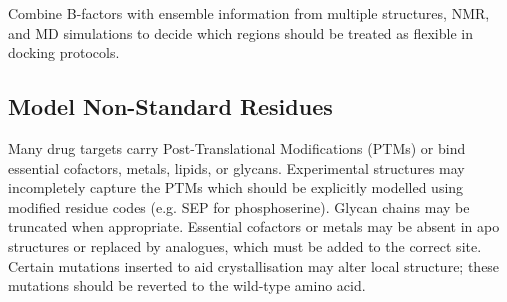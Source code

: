 \documentclass[12pt]{article}
\begin{document}
Combine B-factors with ensemble information from multiple structures, NMR, and MD simulations to decide which regions should be treated as flexible in docking protocols.

\subsection{Model Non-Standard Residues }

Many drug targets carry Post-Translational Modifications (PTMs) or bind essential cofactors, metals, lipids, or glycans. Experimental structures may incompletely capture the PTMs which should be explicitly modelled using modified residue codes (e.g. SEP for phosphoserine). Glycan chains may be truncated when appropriate. Essential cofactors or metals may be absent in apo structures or replaced by analogues, which must be added to the correct site. Certain mutations inserted to aid crystallisation may alter local structure; these mutations should be reverted to the wild-type amino acid.
\end{document}
